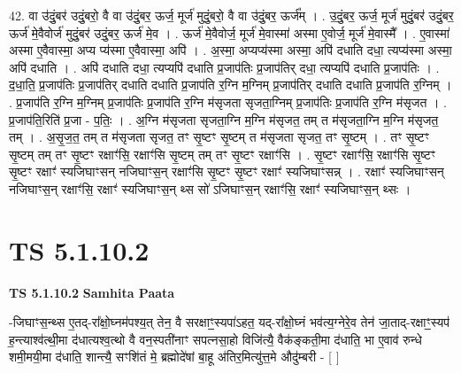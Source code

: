\documentclass[17pt]{extarticle}
\begin{document}
42. वा उ॑दुं॒बर॑ उदुं॒बरो॒ वै वा उ॑दुं॒बर॒ ऊर्ज॒ मूर्ज॑ मुदुं॒बरो॒ वै वा उ॑दुं॒बर॒ ऊर्ज᳚म् । . उ॒दुं॒बर॒ ऊर्ज॒ मूर्ज॑ मुदुं॒बर॑ उदुं॒बर॒ ऊर्ज॑ मे॒वैवोर्ज॑ मुदुं॒बर॑ उदुं॒बर॒ ऊर्ज॑ मे॒व । . ऊर्ज॑ मे॒वैवोर्ज॒ मूर्ज॑ मे॒वास्मा॑ अस्मा ए॒वोर्ज॒ मूर्ज॑ मे॒वास्मै᳚ । . ए॒वास्मा॑ अस्मा ए॒वैवास्मा॒ अप्य प्य॑स्मा ए॒वैवास्मा॒ अपि॑ । . अ॒स्मा॒ अप्यप्य॑स्मा अस्मा॒ अपि॑ दधाति दधा॒ त्यप्य॑स्मा अस्मा॒ अपि॑ दधाति । . अपि॑ दधाति दधा॒ त्यप्यपि॑ दधाति प्र॒जाप॑तिः प्र॒जाप॑तिर् दधा॒ त्यप्यपि॑ दधाति प्र॒जाप॑तिः । . द॒धा॒ति॒ प्र॒जाप॑तिः प्र॒जाप॑तिर् दधाति दधाति प्र॒जाप॑ति र॒ग्नि म॒ग्निम् प्र॒जाप॑तिर् दधाति दधाति प्र॒जाप॑ति र॒ग्निम् । . प्र॒जाप॑ति र॒ग्नि म॒ग्निम् प्र॒जाप॑तिः प्र॒जाप॑ति र॒ग्नि म॑सृजता सृजता॒ग्निम् प्र॒जाप॑तिः प्र॒जाप॑ति र॒ग्नि म॑सृजत । . प्र॒जाप॑ति॒रिति॑ प्र॒जा - प॒तिः॒ । . अ॒ग्नि म॑सृजता सृजता॒ग्नि म॒ग्नि म॑सृजत॒ तम् त म॑सृजता॒ग्नि म॒ग्नि म॑सृजत॒ तम् । . अ॒सृ॒ज॒त॒ तम् त म॑सृजता सृजत॒ तꣳ सृ॒ष्टꣳ सृ॒ष्टम् त म॑सृजता सृजत॒ तꣳ सृ॒ष्टम् । . तꣳ सृ॒ष्टꣳ सृ॒ष्टम् तम् तꣳ सृ॒ष्टꣳ रक्षाꣳ॑सि॒ रक्षाꣳ॑सि सृ॒ष्टम् तम् तꣳ सृ॒ष्टꣳ रक्षाꣳ॑सि । . सृ॒ष्टꣳ रक्षाꣳ॑सि॒ रक्षाꣳ॑सि सृ॒ष्टꣳ सृ॒ष्टꣳ रक्षाꣳ॑ स्यजिघाꣳसन् नजिघाꣳस॒न् रक्षाꣳ॑सि सृ॒ष्टꣳ सृ॒ष्टꣳ रक्षाꣳ॑ स्यजिघाꣳसन्न् । . रक्षाꣳ॑ स्यजिघाꣳसन् नजिघाꣳस॒न् रक्षाꣳ॑सि॒ रक्षाꣳ॑ स्यजिघाꣳस॒न् थ्स सो॑ ऽजिघाꣳस॒न् रक्षाꣳ॑सि॒ रक्षाꣳ॑ स्यजिघाꣳस॒न् थ्सः । \newline
\pagebreak
{}

\section{ TS 5.1.10.2 }

\textbf{TS 5.1.10.2 } \newline
\textbf{Samhita Paata} \newline

-जिघाꣳस॒न्थ्स ए॒तद्-रा᳚क्षो॒घ्नम॑पश्य॒त् तेन॒ वै सरक्षाꣳ॒॒स्यपा॑ऽहत॒ यद्-रा᳚क्षो॒घ्नं भव॑त्य॒ग्नेरे॒व तेन॑ जा॒ताद्-रक्षाꣳ॒॒स्यप॑ ह॒न्त्याश्व॑त्थी॒मा द॑धात्यश्व॒त्थो वै वन॒स्पती॑नाꣳ सपत्नसा॒हो विजि॑त्यै॒ वैक॑ङ्कती॒मा द॑धाति॒ भा ए॒वाव॑ रुन्धे शमी॒मयी॒मा द॑धाति॒ शान्त्यै॒ सꣳशि॑तं मे॒ ब्रह्मोदे॑षां बा॒हू अ॑तिर॒मित्यु॑त्त॒मे औदु॑म्बरी - [  ] \newline
\end{document}
